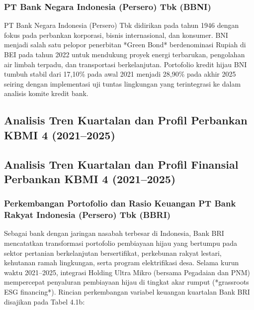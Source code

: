 \documentclass[12pt,a4paper]{article}
\numberwithin{equation}{section}
\begin{document}
\subsubsection{PT Bank Negara Indonesia (Persero) Tbk (BBNI)}
\noindent
PT Bank Negara Indonesia (Persero) Tbk didirikan pada tahun 1946 dengan fokus pada perbankan korporasi, bisnis internasional, dan konsumer. BNI menjadi salah satu pelopor penerbitan *Green Bond* berdenominasi Rupiah di BEI pada tahun 2022 untuk mendukung proyek energi terbarukan, pengolahan air limbah terpadu, dan transportasi berkelanjutan. Portofolio kredit hijau BNI tumbuh stabil dari 17,10\% pada awal 2021 menjadi 28,90\% pada akhir 2025 seiring dengan implementasi uji tuntas lingkungan yang terintegrasi ke dalam analisis komite kredit bank.

\subsection{Analisis Tren Kuartalan dan Profil Perbankan KBMI 4 (2021--2025)}

\subsection{Analisis Tren Kuartalan dan Profil Finansial Perbankan KBMI 4 (2021--2025)}

\subsubsection{Perkembangan Portofolio dan Rasio Keuangan PT Bank Rakyat Indonesia (Persero) Tbk (BBRI)}
\noindent
Sebagai bank dengan jaringan nasabah terbesar di Indonesia, Bank BRI mencatatkan transformasi portofolio pembiayaan hijau yang bertumpu pada sektor pertanian berkelanjutan bersertifikat, perkebunan rakyat lestari, kehutanan ramah lingkungan, serta program elektrifikasi desa. Selama kurun waktu 2021--2025, integrasi Holding Ultra Mikro (bersama Pegadaian dan PNM) mempercepat penyaluran pembiayaan hijau di tingkat akar rumput (*grassroots ESG financing*). Rincian perkembangan variabel keuangan kuartalan Bank BRI disajikan pada Tabel 4.1b:
\end{document}
